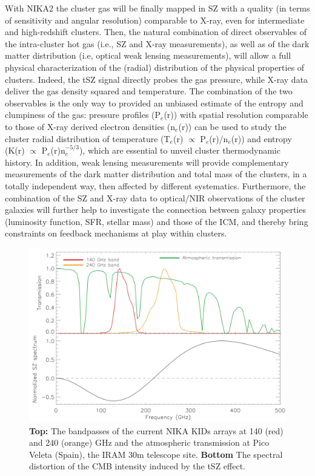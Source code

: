 \documentclass[11pt,a4paper,twoside,graphicx,color]{article}
\begin{document}
With NIKA2 the cluster gas will be finally mapped in SZ with a quality (in terms of sensitivity and angular resolution) comparable to X-ray, even for intermediate and high-redshift clusters. Then, the natural combination of direct observables of the intra-cluster hot gas (i.e., SZ and X-ray measurements), as well as of the dark matter distribution (i.e, optical weak lensing measurements), will allow a full physical characterization of the (radial) distribution of the physical properties of clusters. %
Indeed, the tSZ signal directly probes the gas pressure, while X-ray data deliver the gas density squared and temperature. The combination of the two observables is the only way to provided an unbiased estimate of the entropy and clumpiness of the gas: pressure profiles (P$_e$(r)) with spatial resolution comparable to those of X-ray derived electron densities (n$_e$(r)) can be used to study the cluster radial distribution of temperature  (T$_{e}$(r) $\propto$ P$_{e}$(r)/n$_{e}$(r)) and entropy (K(r) $\propto$ P$_{e}$(r)n$_{e}^{-5/3}$), which are essential to unveil cluster thermodynamic history.
In addition, weak lensing measurements will provide complementary measurements of the dark matter distribution and total mass of the clusters, in a totally independent way, then affected by different systematics.
Furthermore, the combination of the SZ and X-ray data to optical/NIR observations of the cluster galaxies will further help to investigate the connection between galaxy properties (luminosity function, SFR, stellar mass) and those of the ICM, and thereby bring constraints on feedback mechanisms at play within clusters.

\begin{figure}
  \begin{center}
   \includegraphics[width=0.6\columnwidth]{./Figures/NIKA_bp_sz.pdf}
  \end{center}
\caption{{\bf Top:} The bandpasses of the current NIKA KIDs arrays at 140 (red) and 240 (orange) GHz and the atmospheric transmission at Pico Veleta (Spain), the IRAM 30m telescope site. {\bf Bottom} The spectral distortion of the CMB intensity induced by the tSZ effect.}
\label{Fig:bands}
\end{figure}
\end{document}
